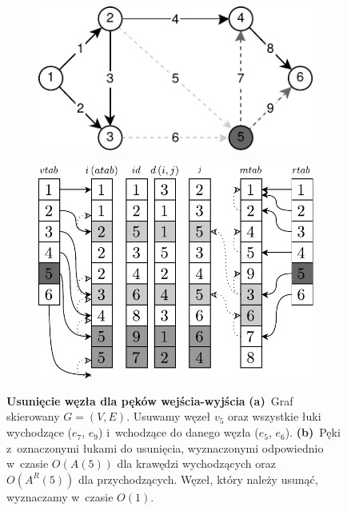\begin{figure}[!htbp]
	\centering
	\null\hfill
	\begin{subfigure}[b]{0.55\textwidth}
		\includegraphics[width=\textwidth]{Chapter_I/FORWARD-REVERSE-REMOVE-Example/a.pdf}
		\caption{}
		\label{fig:forwardReverseStarRepresentationDeleteNode:a}
	\end{subfigure}%
	\hfill
	\begin{subfigure}[b]{0.4\textwidth}
		\includegraphics[width=\textwidth]{Chapter_I/FORWARD-REVERSE-REMOVE-Example/b.pdf}
		\caption{}
		\label{fig:forwardReverseStarRepresentationDeleteNode:b}
	\end{subfigure}
	\hfill\null
	\caption{
		\textbf{Usunięcie węzła dla pęków wejścia-wyjścia}
		\textbf{(a)}~Graf skierowany $G = \left( V, E \right)$.
		Usuwamy węzeł $v_{5}$ oraz wszystkie łuki wychodzące ($e_{7}$, $e_{9}$) i~wchodzące do danego węzła ($e_{5}$, $e_{6}$).
		\textbf{(b)}~Pęki z~oznaczonymi łukami do usunięcia, wyznaczonymi odpowiednio w~czasie $O \left( A \left( 5 \right) \right)$ dla krawędzi wychodzących oraz $O \left( A^{R} \left( 5 \right) \right)$ dla przychodzących.
		Węzeł, który należy usunąć, wyznaczamy w~czasie $O \left( 1 \right)$.
	}
	\label{fig:forwardReverseStarRepresentationDeleteNode}
\end{figure}

